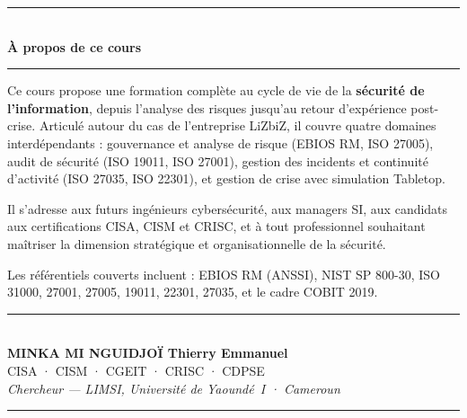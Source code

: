 \documentclass[12pt, a4paper, twoside, openright]{book}
\begin{document}
\vspace*{2.5cm}

\begin{center}
    {\color{CouleurAccent}\rule{0.6\linewidth}{1pt}}\\[1.5ex]
    {\color{white}\Large\bfseries À propos de ce cours}\\[1.5ex]
    {\color{CouleurAccent}\rule{0.6\linewidth}{1pt}}
\end{center}

\vspace{1cm}

\begin{center}
\begin{minipage}{0.75\textwidth}
\color{white!85!gray}

Ce cours propose une formation complète au cycle de vie de la \textbf{sécurité de l'information}, depuis l'analyse des risques jusqu'au retour d'expérience post-crise. Articulé autour du cas de l'entreprise LiZbiZ, il couvre quatre domaines interdépendants : gouvernance et analyse de risque (EBIOS RM, ISO 27005), audit de sécurité (ISO 19011, ISO 27001), gestion des incidents et continuité d'activité (ISO 27035, ISO 22301), et gestion de crise avec simulation Tabletop.

\medskip

Il s'adresse aux futurs ingénieurs cybersécurité, aux managers SI, aux candidats aux certifications CISA, CISM et CRISC, et à tout professionnel souhaitant maîtriser la dimension stratégique et organisationnelle de la sécurité.

\medskip

Les référentiels couverts incluent : EBIOS RM (ANSSI), NIST SP 800-30, ISO 31000, 27001, 27005, 19011, 22301, 27035, et le cadre COBIT 2019.
\end{minipage}
\end{center}

\vfill

\begin{center}
    {\color{CouleurAccent}\rule{0.5\linewidth}{0.8pt}}\\[1ex]
    {\color{white}\bfseries MINKA MI NGUIDJOÏ Thierry Emmanuel}\\[0.3ex]
    {\color{white!75!gray}\footnotesize CISA · CISM · CGEIT · CRISC · CDPSE}\\[0.3ex]
    {\color{white!65!gray}\footnotesize\itshape
        Chercheur — LIMSI, Université de Yaoundé~I · Cameroun}\\[1ex]
    {\color{CouleurAccent}\rule{0.5\linewidth}{0.8pt}}
\end{center}

\vspace{1cm}
\afterpage{\nopagecolor}
\end{document}

